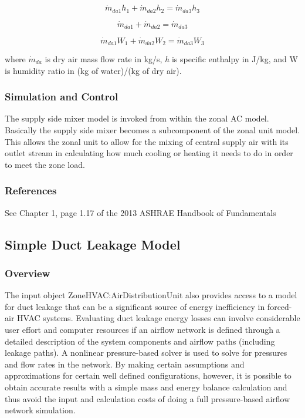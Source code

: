 \begin{equation}
{\dot m_{da1}}{h_1} + {\dot m_{da2}}{h_2} = {\dot m_{da3}}{h_3}
\end{equation}

\begin{equation}
{\dot m_{da1}} + {\dot m_{da2}} = {\dot m_{da3}}
\end{equation}

\begin{equation}
{\dot m_{da1}}{W_1} + {\dot m_{da2}}{W_2} = {\dot m_{da3}}{W_3}
\end{equation}

where \({\dot m_{da}}\) is dry air mass flow rate in kg/s, \emph{h} is specific enthalpy in J/kg, and W is humidity ratio in (kg of water)/(kg of dry air).

\subsubsection{Simulation and Control}\label{simulation-and-control-2-001}

The supply side mixer model is invoked from within the zonal AC model. Basically the supply side mixer becomes a subcomponent of the zonal unit model. This allows the zonal unit to allow for the mixing of central supply air with its outlet stream in calculating how much cooling or heating it needs to do in order to meet the zone load.

\subsubsection{References}\label{references-2-009}

See Chapter 1, page 1.17 of the 2013 ASHRAE Handbook of Fundamentals

\subsection{Simple Duct Leakage Model}\label{simple-duct-leakage-model}

\subsubsection{Overview}\label{overview-3-005}

The input object ZoneHVAC:AirDistributionUnit also provides access to a model for duct leakage that can be a significant source of energy inefficiency in forced-air HVAC systems. Evaluating duct leakage energy losses can involve considerable user effort and computer resources if an airflow network is defined through a detailed description of the system components and airflow paths (including leakage paths). A nonlinear pressure-based solver is used to solve for pressures and flow rates in the network. By making certain assumptions and approximations for certain well defined configurations, however, it is possible to obtain accurate results with a simple mass and energy balance calculation and thus avoid the input and calculation costs of doing a full pressure-based airflow network simulation.

